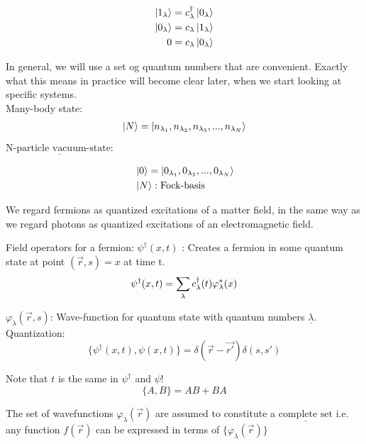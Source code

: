 \begin{align*}
	\ket{1_\lambda} &= c^{\dagger}_\lambda \ket{0_\lambda}\\
	\ket{0_\lambda} &= c_\lambda \ket{1_\lambda}\\
	0 &= c_\lambda \ket{0_\lambda}
\end{align*}

\noindent In general, we will use a set og quantum numbers that are convenient. Exactly what this means in practice will become clear later, when we start looking at specific systems.\\

\noindent Many-body state:
\begin{align*}
	\ket{N}= \ket{ n_{\lambda_1}, n_{\lambda_2} ,n_{\lambda_3} ,...,  n_{\lambda_N}} 
\end{align*}

\noindent $\underline{\text{N-particle vacuum-state:}}$

\begin{align}
	&\ket{0} = \ket{0_{\lambda_1},0_{\lambda_2},...,0_{\lambda_N}}\\
	&\ket{N} : \text{Fock-basis} \nonumber
\end{align}

\noindent We regard fermions as quantized excitations of a matter field, in the same way as we regard photons as quantized excitations of an electromagnetic field.

Field operators for a fermion: $\psi^\dagger(x,t)$ : Creates a fermion in some quantum state at point $(\vec{r},s)=x$ at time t.
\begin{equation}
	\psi^\dagger(x,t)= \sum_\lambda c^{\dagger}_\lambda(t) \varphi_\lambda^*(x)
\end{equation}

\noindent $\varphi_\lambda(\vec{r},s)$: Wave-function for quantum state with quantum numbers $\underline{\lambda}$.\\

\noindent Quantization:
\begin{equation}
	\{\psi^\dagger (x,t), \psi(x,t) \}= \delta(\vec{r}-\vec{r'}) \delta(s,s')
\end{equation}

Note that $t$ is the same in $\psi^\dagger$ and $\psi$!
\begin{equation}
	\{A,B\}= AB+BA
\end{equation}

\noindent The set of wavefunctions $\varphi_\lambda(\vec{r})$ are assumed to constitute a $\underline{\text{complete set}}$ i.e. any function $f(\vec{r})$ can be expressed in terms of $\{\varphi_\lambda(\vec{r})\}$

